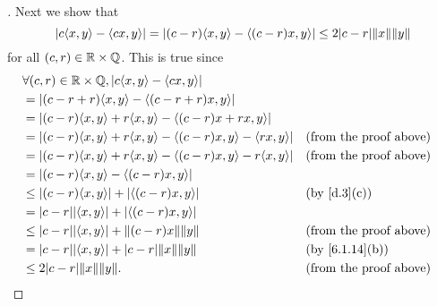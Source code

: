 \begin{proof}[]
	Next we show that
	\[
		\abs{c \inn{x, y} - \inn{cx, y}} = \abs{(c - r) \inn{x, y} - \inn{(c - r) x, y}} \leq 2 \abs{c - r} \norm{x} \norm{y}
	\]
	for all \((c, r) \in \mathbb{R} \times \mathbb{Q}\).
	This is true since
	\begin{align*}
		 & \forall (c, r) \in \R \times \Q, \abs{c \inn{x, y} - \inn{cx, y}}                                               \\
		 & = \abs{(c - r + r) \inn{x, y} - \inn{(c - r + r) x, y}}                                                         \\
		 & = \abs{(c - r) \inn{x, y} + r \inn{x, y} - \inn{(c - r)x + rx, y}}                                              \\
		 & = \abs{(c - r) \inn{x, y} + r \inn{x, y} - \inn{(c - r)x, y} - \inn{rx, y}}  &  & \text{(from the proof above)} \\
		 & = \abs{(c - r) \inn{x, y} + r \inn{x, y} - \inn{(c - r)x, y} - r \inn{x, y}} &  & \text{(from the proof above)} \\
		 & = \abs{(c - r) \inn{x, y} - \inn{(c - r) x, y}}                                                                 \\
		 & \leq \abs{(c - r) \inn{x, y}} + \abs{\inn{(c - r) x, y}}                     &  & \by{d.3}[c]                   \\
		 & = \abs{c - r} \abs{\inn{x, y}} + \abs{\inn{(c - r) x, y}}                                                       \\
		 & \leq \abs{c - r} \abs{\inn{x, y}} + \norm{(c - r) x} \norm{y}                &  & \text{(from the proof above)} \\
		 & = \abs{c - r} \abs{\inn{x, y}} + \abs{c - r} \norm{x} \norm{y}               &  & \by{6.1.14}[b]                \\
		 & \leq 2 \abs{c - r} \norm{x} \norm{y}.                                        &  & \text{(from the proof above)}
	\end{align*}


\end{proof}
